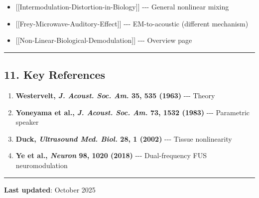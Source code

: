 \begin{itemize}
\tightlist
\item
  {[}{[}Intermodulation-Distortion-in-Biology{]}{]} -\/-\/- General
  nonlinear mixing\\
\item
  {[}{[}Frey-Microwave-Auditory-Effect{]}{]} -\/-\/- EM-to-acoustic
  (different mechanism)\\
\item
  {[}{[}Non-Linear-Biological-Demodulation{]}{]} -\/-\/- Overview page
\end{itemize}

\begin{center}\rule{0.5\linewidth}{0.5pt}\end{center}

\subsection{11. Key References}\label{key-references}

\begin{enumerate}
\def\labelenumi{\arabic{enumi}.}
\tightlist
\item
  \textbf{Westervelt, \emph{J. Acoust. Soc. Am.} 35, 535 (1963)} -\/-\/-
  Theory\\
\item
  \textbf{Yoneyama et al., \emph{J. Acoust. Soc. Am.} 73, 1532 (1983)}
  -\/-\/- Parametric speaker\\
\item
  \textbf{Duck, \emph{Ultrasound Med. Biol.} 28, 1 (2002)} -\/-\/-
  Tissue nonlinearity\\
\item
  \textbf{Ye et al., \emph{Neuron} 98, 1020 (2018)} -\/-\/-
  Dual-frequency FUS neuromodulation
\end{enumerate}

\begin{center}\rule{0.5\linewidth}{0.5pt}\end{center}

\textbf{Last updated}: October 2025
